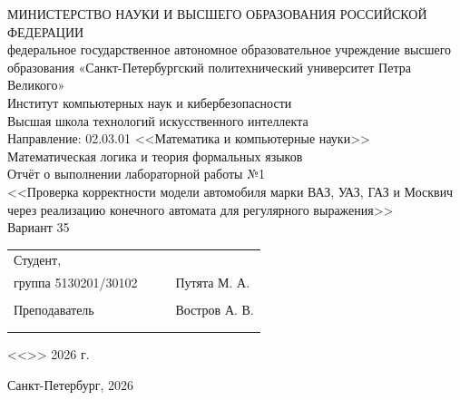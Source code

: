 \documentclass[a4paper,final]{article}
\begin{document}
\thispagestyle{empty}
\begin{center}
\hfill \break
\hfill \break
\normalsize{МИНИСТЕРСТВО НАУКИ И ВЫСШЕГО ОБРАЗОВАНИЯ РОССИЙСКОЙ ФЕДЕРАЦИИ\\
 федеральное государственное автономное образовательное учреждение высшего образования «Санкт-Петербургский политехнический университет Петра Великого»\\[10pt]}
\normalsize{Институт компьютерных наук и кибербезопасности}\\[10pt] 
\normalsize{Высшая школа технологий искусственного интеллекта}\\[10pt] 
\normalsize{Направление: 02.03.01 <<Математика и компьютерные науки>>}\\
\vspace{50pt}
{\large Математическая логика и теория формальных языков\\
Отчёт о выполнении лабораторной работы №1 \\
<<Проверка корректности модели автомобиля марки ВАЗ, УАЗ, ГАЗ и Москвич через реализацию конечного автомата для регулярного выражения>>\\[1em]
Вариант 35}
\end{center}
 \vspace{70pt}
\small{ 
\begin{tabular}{lrrl}
\!\!\!Студент, & \hspace{2cm} & & \\
\!\!\!группа 5130201/30102 & \hspace{2cm} & \underline{\hspace{3cm}} & Путята М. А.  \\\\
\!\!\!Преподаватель & \hspace{2cm} & \underline{\hspace{3cm}} &  Востров А. В. \\\\
&&\hspace{5cm}
\end{tabular}
\begin{flushright}
<<\underline{\hspace{1cm}}>>\underline{\hspace{2.5cm}} 2026 г.
\end{flushright}
}

\hfill \break
\begin{center} \small{Санкт-Петербург, 2026} \end{center}


\newpage
\tableofcontents
\newpage
\end{document}
